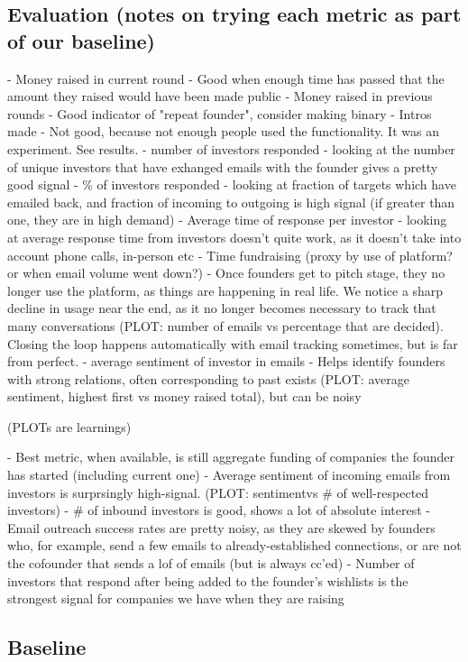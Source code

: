 \subsection{Evaluation (notes on trying each metric as part of our baseline)}
- Money raised in current round
  - Good when enough time has passed that the amount they raised would have been made public
- Money raised in previous rounds
  - Good indicator of "repeat founder", consider making binary
- Intros made
  - Not good, because not enough people used the functionality. It was an experiment. See results.
- number of investors responded
  - looking at the number of unique investors that have exhanged emails with the founder gives a pretty good signal
- \% of investors responded
  - looking at fraction of targets which have emailed back, and fraction of incoming to outgoing is high signal (if greater than one, they are in high demand)
- Average time of response per investor
  - looking at average response time from investors doesn't quite work, as it doesn't take into account phone calls, in-person etc
- Time fundraising (proxy by use of platform? or when email volume went down?)
  - Once founders get to pitch stage, they no longer use the platform, as things are happening in real life. We notice a sharp decline in usage near the end, as it no longer becomes necessary to track that many conversations (PLOT: number of emails vs percentage that are decided). Closing the loop happens automatically with email tracking sometimes, but is far from perfect.
- average sentiment of investor in emails
  - Helps identify founders with strong relations, often corresponding to past exists (PLOT: average sentiment, highest first vs money raised total), but can be noisy

(PLOTs are learnings)

- Best metric, when available, is still aggregate funding of companies the founder has started (including current one)
- Average sentiment of incoming emails from investors is surprsingly high-signal. (PLOT: sentimentvs \# of well-respected investors)
- \# of inbound investors is good, shows a lot of absolute interest
- Email outreach success rates are pretty noisy, as they  are skewed by founders who, for example, send a few emails to already-established connections, or are not the cofounder that sends a lof of emails (but is always cc'ed)
- Number of investors that respond after being added to the founder's wishlists is the strongest signal for companies we have when they are raising

\subsection{Baseline}

